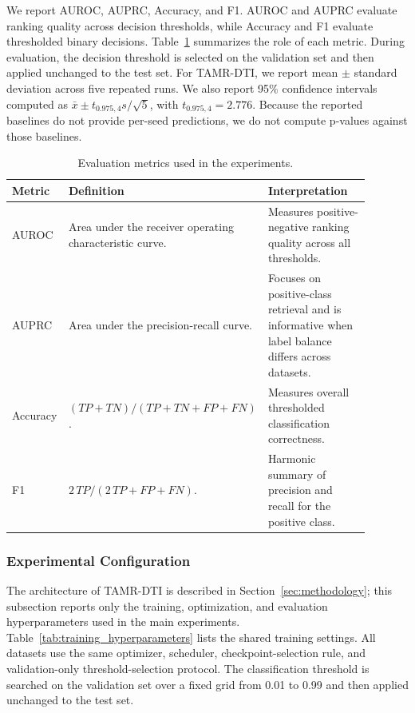 We report AUROC, AUPRC, Accuracy, and F1. AUROC and AUPRC evaluate ranking quality across decision thresholds, while Accuracy and F1 evaluate thresholded binary decisions. Table~\ref{tab:evaluation_metrics} summarizes the role of each metric. During evaluation, the decision threshold is selected on the validation set and then applied unchanged to the test set. For TAMR-DTI, we report mean $\pm$ standard deviation across five repeated runs. We also report 95\% confidence intervals computed as $\bar{x} \pm t_{0.975,4}s/\sqrt{5}$, with $t_{0.975,4}=2.776$. Because the reported baselines do not provide per-seed predictions, we do not compute p-values against those baselines.

\begin{table}[!htbp]
\caption{Evaluation metrics used in the experiments.}
\label{tab:evaluation_metrics}
\begin{center}
\begin{tabular}{>{\raggedright\arraybackslash}p{0.16\linewidth}>{\raggedright\arraybackslash}p{0.39\linewidth}>{\raggedright\arraybackslash}p{0.34\linewidth}}
\toprule
Metric & Definition & Interpretation \\
\midrule
AUROC & Area under the receiver operating characteristic curve. & Measures positive-negative ranking quality across all thresholds. \\
AUPRC & Area under the precision-recall curve. & Focuses on positive-class retrieval and is informative when label balance differs across datasets. \\
Accuracy & $(TP+TN)/(TP+TN+FP+FN)$. & Measures overall thresholded classification correctness. \\
F1 & $2\,TP/(2\,TP+FP+FN)$. & Harmonic summary of precision and recall for the positive class. \\
\bottomrule
\end{tabular}
\end{center}
\end{table}

\subsubsection{Experimental Configuration}
\label{sec:implementation_details}

The architecture of TAMR-DTI is described in Section~\ref{sec:methodology}; this subsection reports only the training, optimization, and evaluation hyperparameters used in the main experiments. Table~\ref{tab:training_hyperparameters} lists the shared training settings. All datasets use the same optimizer, scheduler, checkpoint-selection rule, and validation-only threshold-selection protocol. The classification threshold is searched on the validation set over a fixed grid from 0.01 to 0.99 and then applied unchanged to the test set.


